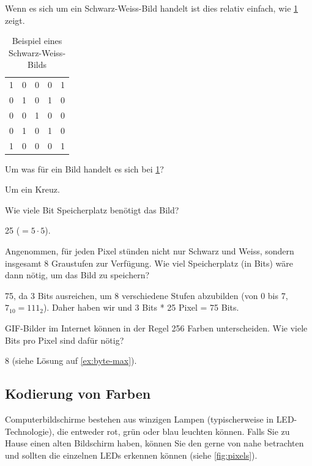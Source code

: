 Wenn es sich um ein Schwarz-Weiss-Bild handelt ist dies relativ einfach, wie \cref{table:bw-img} zeigt.

\begin{table}[H]
	\centering
	\begin{tabular}{lllll}
		1 & 0 & 0 & 0 & 1 \\
		0 & 1 & 0 & 1 & 0 \\
		0 & 0 & 1 & 0 & 0 \\
		0 & 1 & 0 & 1 & 0 \\
		1 & 0 & 0 & 0 & 1
	\end{tabular}
	\caption{Beispiel eines Schwarz-Weiss-Bilds}
	\label{table:bw-img}
\end{table}

\begin{myexercise}
	Um was für ein Bild handelt es sich bei \cref{table:bw-img}?
	\begin{myanswer}
		Um ein Kreuz.
	\end{myanswer}
\end{myexercise}

\begin{myexercise}
	Wie viele Bit Speicherplatz benötigt das Bild?
	\begin{myanswer}
		25 ($= 5\cdot 5$).
	\end{myanswer}
\end{myexercise}

\begin{myexercise}
	Angenommen, für jeden Pixel stünden nicht nur Schwarz und Weiss, sondern insgesamt 8 Graustufen zur Verfügung. Wie viel Speicherplatz (in Bits) wäre dann nötig, um das Bild zu speichern?
	\begin{myanswer}
		75, da 3 Bits ausreichen, um 8 verschiedene Stufen abzubilden (von 0 bis 7, $7_{10}=111_2$). Daher haben wir und 3 Bits * 25 Pixel = 75 Bits.
	\end{myanswer}
\end{myexercise}

\begin{myexercise}
	\gls{GIF}-Bilder im Internet können in der Regel 256 Farben unterscheiden. Wie viele Bits pro Pixel sind dafür nötig?
	\begin{myanswer}
		8 (siehe Lösung auf \cref{ex:byte-max}).
	\end{myanswer}
\end{myexercise}

\subsection{Kodierung von Farben}
Computerbildschirme bestehen aus winzigen Lampen (typischerweise in \gls{LED}-Technologie), die entweder rot, grün oder blau leuchten können. Falls Sie zu Hause einen alten Bildschirm haben, können Sie den gerne von nahe betrachten und sollten die einzelnen \glspl{LED} erkennen können (siehe \cref{fig:pixels}).

